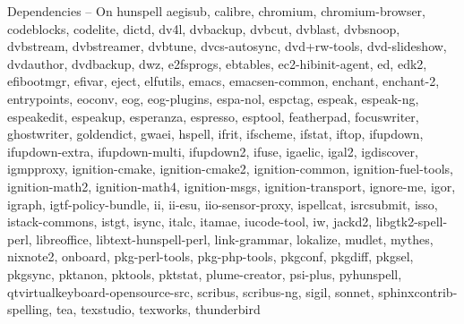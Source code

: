 \documentclass{beamer}
\begin{document}
\begin{frame}{Dependencies – On hunspell}
\footnotesize aegisub, calibre, chromium, \alert{chromium-browser}, codeblocks, codelite, dictd, dv4l, dvbackup, dvbcut, dvblast, dvbsnoop, dvbstream, dvbstreamer, dvbtune, dvcs-autosync, dvd+rw-tools, dvd-slideshow, dvdauthor, dvdbackup, dwz, e2fsprogs, ebtables, ec2-hibinit-agent, ed, edk2, efibootmgr, efivar, eject, elfutils, emacs, emacsen-common, enchant, \alert{enchant-2}, entrypoints, eoconv, eog, eog-plugins, espa-nol, espctag, espeak, espeak-ng, espeakedit, espeakup, esperanza, espresso, esptool, featherpad, focuswriter, ghostwriter, goldendict, gwaei, \alert{hspell}, ifrit, ifscheme, ifstat, iftop, ifupdown, ifupdown-extra, ifupdown-multi, ifupdown2, ifuse, igaelic, igal2, igdiscover, igmpproxy, ignition-cmake, ignition-cmake2, ignition-common, ignition-fuel-tools, ignition-math2, ignition-math4, ignition-msgs, ignition-transport, ignore-me, igor, igraph, igtf-policy-bundle, ii, ii-esu, iio-sensor-proxy, \alert{ispellcat}, isrcsubmit, isso, istack-commons, istgt, isync, italc, itamae, iucode-tool, iw, jackd2, libgtk2-spell-perl, libreoffice, libtext-hunspell-perl, link-grammar, lokalize, mudlet, \alert{mythes}, nixnote2, onboard, pkg-perl-tools, pkg-php-tools, pkgconf, pkgdiff, pkgsel, pkgsync, pktanon, pktools, pktstat, plume-creator, psi-plus, \alert{pyhunspell}, qtvirtualkeyboard-opensource-src, scribus, \alert{scribus-ng}, sigil, sonnet, sphinxcontrib-spelling, tea, texstudio, texworks, \alert{thunderbird}
\end{frame}
\end{document}
